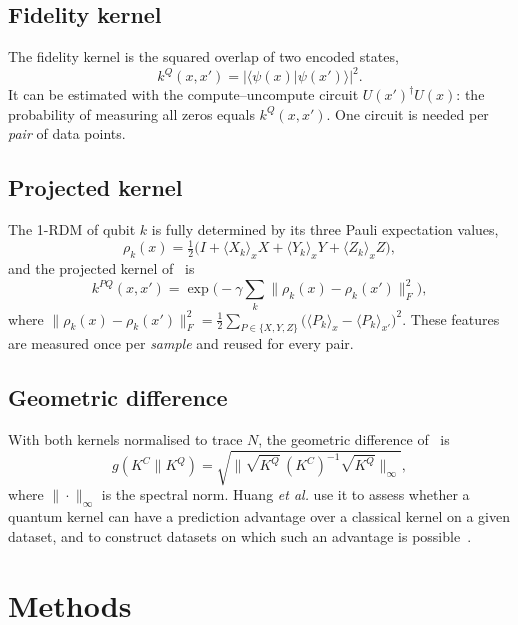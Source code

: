 \documentclass[conference]{IEEEtran}
\begin{document}
\subsection{Fidelity kernel}
The fidelity kernel is the squared overlap of two encoded states,
\begin{equation}
k^{Q}(x,x') = |\langle \psi(x)|\psi(x')\rangle|^{2}.
\end{equation}
It can be estimated with the compute--uncompute circuit $U(x')^\dagger U(x)$: the probability of measuring all zeros equals $k^{Q}(x,x')$. One circuit is needed per \emph{pair} of data points.

\subsection{Projected kernel}
The 1-RDM of qubit $k$ is fully determined by its three Pauli expectation values,
\begin{equation}
\rho_k(x)=\tfrac{1}{2}\big(I+\langle X_k\rangle_x X+\langle Y_k\rangle_x Y+\langle Z_k\rangle_x Z\big),
\end{equation}
and the projected kernel of~\cite{huang2021} is
\begin{equation}
k^{PQ}(x,x') = \exp\!\Big(-\gamma \sum_{k}\big\|\rho_k(x)-\rho_k(x')\big\|_F^{2}\Big),
\end{equation}
where $\|\rho_k(x)-\rho_k(x')\|_F^2=\tfrac{1}{2}\sum_{P\in\{X,Y,Z\}}\big(\langle P_k\rangle_x-\langle P_k\rangle_{x'}\big)^2$. These features are measured once per \emph{sample} and reused for every pair.

\subsection{Geometric difference}
With both kernels normalised to trace $N$, the geometric difference of~\cite{huang2021} is
\begin{equation}
g(K^{C}\|K^{Q})=\sqrt{\Big\|\sqrt{K^{Q}}\,(K^{C})^{-1}\sqrt{K^{Q}}\Big\|_{\infty}},
\end{equation}
where $\|\cdot\|_\infty$ is the spectral norm. Huang \textit{et al.} use it to assess whether a quantum kernel can have a prediction advantage over a classical kernel on a given dataset, and to construct datasets on which such an advantage is possible~\cite{huang2021}.

\section{Methods}
\end{document}
